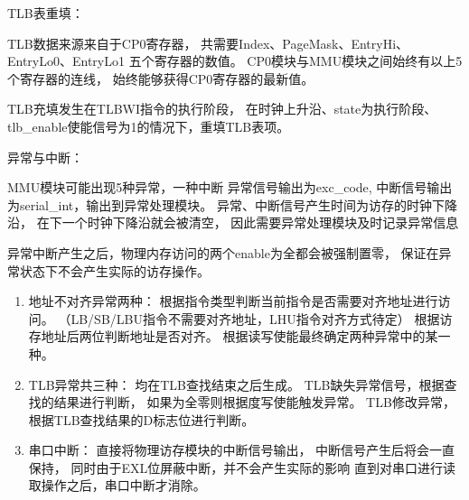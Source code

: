             
            TLB表重填：%
            \begin{minipage}[t]{0.8\linewidth}
                TLB数据来源来自于CP0寄存器，%
                共需要Index、PageMask、EntryHi、EntryLo0、EntryLo1%
                五个寄存器的数值。%
                CP0模块与MMU模块之间始终有以上5个寄存器的连线，%
                始终能够获得CP0寄存器的最新值。%

                TLB充填发生在TLBWI指令的执行阶段，%
                在时钟上升沿、state为执行阶段、%
                tlb\_enable使能信号为1的情况下，重填TLB表项。%
            \end{minipage}

            异常与中断：
            \begin{minipage}[t]{0.8\linewidth}
                MMU模块可能出现5种异常，一种中断%
                异常信号输出为exc\_code, %
                中断信号输出为serial\_int，输出到异常处理模块。%
                异常、中断信号产生时间为访存的时钟下降沿，%
                在下一个时钟下降沿就会被清空，%
                因此需要异常处理模块及时记录异常信息

                异常中断产生之后，物理内存访问的两个enable为全都会被强制置零，%
                保证在异常状态下不会产生实际的访存操作。

                \begin{enumerate}
                \item
                地址不对齐异常两种：%
                    根据指令类型判断当前指令是否需要对齐地址进行访问。%
                    （LB/SB/LBU指令不需要对齐地址，LHU指令对齐方式待定）%
                    根据访存地址后两位判断地址是否对齐。%
                    根据读写使能最终确定两种异常中的某一种。%
                \item
                TLB异常共三种：%
                    均在TLB查找结束之后生成。%
                    TLB缺失异常信号，根据查找的结果进行判断，%
                    如果为全零则根据度写使能触发异常。%
                    TLB修改异常，根据TLB查找结果的D标志位进行判断。%
                \item
                串口中断：%
                    直接将物理访存模块的中断信号输出，%
                    中断信号产生后将会一直保持，%
                    同时由于EXL位屏蔽中断，并不会产生实际的影响%
                    直到对串口进行读取操作之后，串口中断才消除。
                \end{enumerate}
            \end{minipage}

